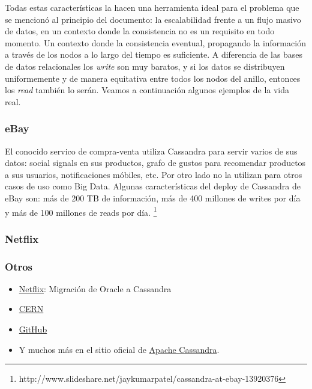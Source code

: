 \documentclass[11pt,a4paper]{article}
\begin{document}
Todas estas características la hacen una herramienta ideal para el problema que se mencionó al principio del documento: la escalabilidad frente a un flujo masivo de datos, en un contexto donde la consistencia no es un requisito en todo momento. Un contexto donde la consistencia eventual, propagando la información a través de los nodos a lo largo del tiempo es suficiente. A diferencia de las bases de datos relacionales los \textit{write} son muy baratos, y si los datos se distribuyen uniformemente y de manera equitativa entre todos los nodos del anillo, entonces los \textit{read} también lo serán. Veamos a continuación algunos ejemplos de la vida real.

\subsubsection{eBay}
El conocido servico de compra-venta utiliza Cassandra para servir varios de sus datos: social signals en sus productos, grafo de gustos para recomendar productos a sus usuarios, notificaciones móbiles, etc. Por otro lado no la utilizan para otros casos de uso como Big Data. Algunas características del deploy de Cassandra de eBay son: más de 200 TB de información, más de 400 millones de writes por día y más de 100 millones de reads por día. \footnote{http://www.slideshare.net/jaykumarpatel/cassandra-at-ebay-13920376}

\subsubsection{Netflix}

\subsubsection{Otros}

\begin{itemize}
	\item \href{http://www.slideshare.net/adrianco/migrating-netflix-from-oracle-to-global-cassandra}{Netflix}: Migración de Oracle a Cassandra
    \item \href{http://indico.cern.ch/event/93877/session/14/material/poster/0?contribId=19}{CERN}
	\item \href{http://live-pc-development.pantheon.io/blog/analytics-at-github-with-apache-cassandra/}{GitHub}
	\item Y muchos más en el sitio oficial de \href{http://cassandra.apache.org/}{Apache Cassandra}.
\end{itemize}
\end{document}
